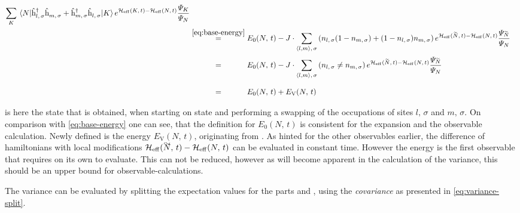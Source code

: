 \begin{equation}
\begin{split}
        \lsum[K] \bracketHelper{N}{ \withspinhcop{l}{\sigma}{\dagger} \withspinhcop{m}{\sigma}{} + \withspinhcop{m}{\sigma}{\dagger} \withspinhcop{l}{\sigma}{} }{K} e^{\HeffOft[K]-\HeffOft[N]}
        \frac{
            \psiN[K]
        }{
            \psiN[N]
        }\\
        &\stackrel{\ref{eq:base-energy}}{=} E_0(N,\,t)-
        J \cdot \neighborsumWSpin{l}{m}{\sigma}
        \left(n_{l,\,\sigma} (1- n_{m,\,\sigma}) + (1-n_{l,\,\sigma}) n_{m,\,\sigma}\right)
         e^{\HeffOft[\vphantom{N}\smash{\tilde{N}}]-\HeffOft[N]}
        \frac{
            \psiN[\vphantom{N}\smash{\tilde{N}}]
        }{
            \psiN[N]
        }\\
        &\stackrel{\phantom{\ref{eq:base-energy}}}{=} E_0(N,\,t)-
        J \cdot \neighborsumWSpin{l}{m}{\sigma}
        \left(n_{l,\,\sigma} \neq n_{m,\,\sigma}\right)
         e^{\HeffOft[\vphantom{N}\smash{\tilde{N}}]-\HeffOft[N]}
        \frac{
            \psiN[\vphantom{N}\smash{\tilde{N}}]
        }{
            \psiN[N]
        }\\
        &\stackrel{\phantom{\ref{eq:base-energy}}}{=} E_0(N,\,t) + E_\text{V}(N,\,t)
    \end{split}
\end{equation}

 is here the state that is obtained, when starting on state \ketN and performing a swapping of the occupations of sites $l,\,\sigma$ and $m,\,\sigma$.
On comparison with \autoref{eq:base-energy} one can see, that the definition for $E_0(N,\,t)$ is consistent for the expansion and the observable calculation.
Newly defined is the energy $E_\text{V}(N,\,t)$, originating from \Vhamiltonian[].
As hinted for the other observables earlier, the difference of hamiltonians with local modifications $\HeffOft[\vphantom{N}\smash{\tilde{N}}]-\HeffOft[N]$ can be evaluated in constant time.
However the energy is the first observable that requires  on its own to evaluate. This can not be reduced, however as will become apparent in the calculation of the variance, this should be an upper bound for observable-calculations.

The variance can be evaluated by splitting the expectation values for the parts \HzeroHamiltonian[\schroedingerPicture] and \Vhamiltonian[\schroedingerPicture], using the \emph{covariance} as presented in \autoref{eq:variance-split}.

